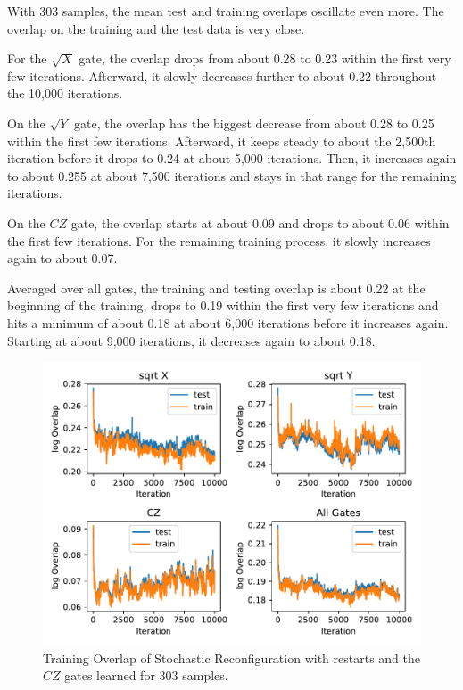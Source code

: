 With 303 samples, the mean test and training overlaps oscillate even more. The overlap on the training and the 
test data is very close. 

For the $\sqrt{X}$ gate, the overlap drops from about 0.28 to 0.23 within the first very few iterations. 
Afterward, it slowly decreases further to about 0.22 throughout the 10,000 iterations.

On the $\sqrt{Y}$ gate, the overlap has the biggest decrease from about 0.28 to 0.25 within the first 
few iterations. Afterward, it keeps steady to about the 2,500th iteration before it drops to 0.24 at about 5,000 iterations.
Then, it increases again to about 0.255 at about 7,500 iterations and stays in that range for the remaining iterations.

On the $CZ$ gate, the overlap starts at about 0.09 and drops to about 0.06 within the first few iterations. 
For the remaining training process, it slowly increases again to about 0.07. 

Averaged over all gates, the training and testing overlap is about 0.22 at the beginning of the training, 
drops to 0.19 within the first very few iterations and hits a minimum of about 0.18 at about 6,000 iterations before 
it increases again. Starting at about 9,000 iterations, it decreases again to about 0.18.

\begin{figure}[H]
  \centering
  \includegraphics[width=\textwidth]{figures/results/SR-restarts-learned/avgOverlap_303.pdf}
  \caption[Training overlap of Stochastic Reconfiguration with restarts learned]{Training 
  Overlap of Stochastic Reconfiguration with restarts and the $CZ$ gates learned for 303 samples.}
  \label{fig:sr_restarts_overlap_303}
\end{figure}

